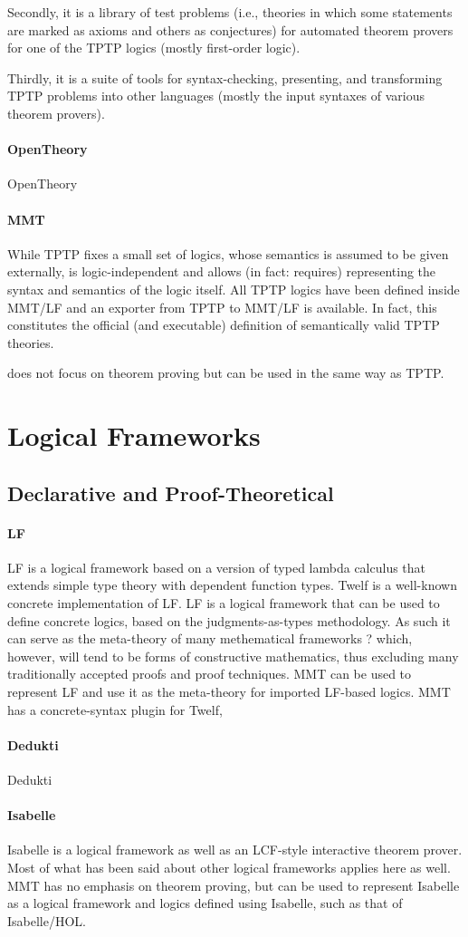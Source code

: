 \documentclass[12pt]{article}
\newcommand{\system}[2][]{\paragraph{#2}#2 \ifnonempty[\cite{#2}]{#1}{\cite{#1}}}
\begin{document}
Secondly, it is a library of test problems (i.e., theories in which some statements are marked as axioms and others as conjectures) for automated theorem provers for one of the TPTP logics (mostly first-order logic).

Thirdly, it is a suite of tools for syntax-checking, presenting, and transforming TPTP problems into other languages (mostly the input syntaxes of various theorem provers).

\system{OpenTheory}

\paragraph{MMT}
While TPTP fixes a small set of logics, whose semantics is assumed to be given externally, \mmt is logic-independent and allows (in fact: requires) representing the syntax and semantics of the logic itself.
All TPTP logics have been defined inside MMT/LF and an exporter from TPTP to MMT/LF is available.
In fact, this constitutes the official (and executable) definition of semantically valid TPTP theories.

\mmt does not focus on theorem proving but can be used in the same way as TPTP.

\section{Logical Frameworks}

\subsection{Declarative and Proof-Theoretical}

\system{LF} is a logical framework based on a version of typed lambda calculus that extends simple type theory with dependent function types. Twelf is a well-known concrete implementation of LF. LF is a logical framework that can be used to define concrete logics, based on the judgments-as-types methodology. As such it can serve as the meta-theory of many methematical frameworks ? which, however, will tend to be forms of constructive mathematics, thus excluding many traditionally accepted proofs and proof techniques.
MMT can be used to represent LF and use it as the meta-theory for imported LF-based logics. MMT has a concrete-syntax plugin for Twelf,

\system{Dedukti}

\system{Isabelle} is a logical framework as well as an LCF-style interactive theorem prover.  Most of what has been said about other logical frameworks applies here as well.  MMT has no emphasis on theorem proving, but can be used to represent Isabelle as a logical framework and logics defined using Isabelle, such as that of Isabelle/HOL.
\end{document}
